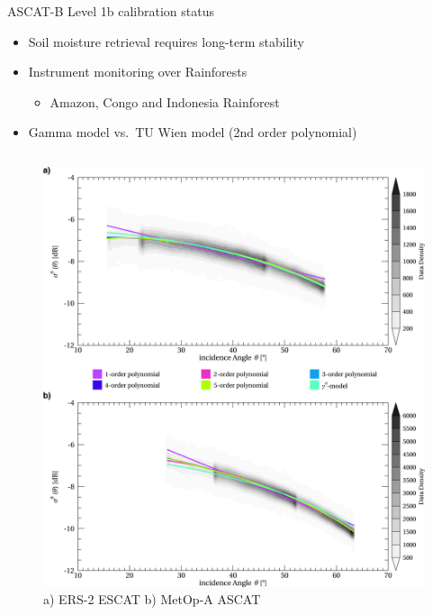 \documentclass[10pt,ignorenonframetext,xcolor={dvipsnames, table}]{beamer}
\providecommand{\tightlist}{%
\setlength{\itemsep}{0pt}\setlength{\parskip}{0pt}}
\begin{document}
\begin{frame}{ASCAT-B Level 1b calibration status}

\begin{itemize}
\tightlist
\item
  Soil moisture retrieval requires long-term stability
\item
  Instrument monitoring over Rainforests

  \begin{itemize}
  \tightlist
  \item
    Amazon, Congo and Indonesia Rainforest
  \end{itemize}
\item
  Gamma model vs.~TU Wien model (2nd order polynomial)
\end{itemize}

\begin{columns}


\begin{figure}
\includegraphics[width=.99\textwidth]{./figures/Backscatter_Models.png}
\caption{a) ERS-2 ESCAT b) MetOp-A ASCAT}
\end{figure}



\end{columns}
\end{frame}
\end{document}
